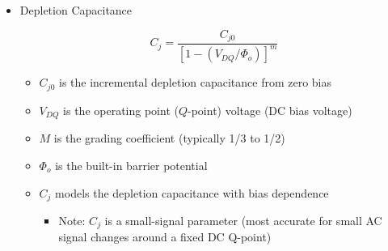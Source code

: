 \begin{itemize}
\begin{itemize}
\begin{itemize}
\begin{itemize}
            \end{itemize}

        \end{itemize}

    \end{itemize}

  \item Depletion Capacitance

    $$C_j=\frac{C_{j0}}{[1-(V_{DQ}/\Phi_o)]^m}$$

    \begin{itemize}

      \item $C_{j0}$ is the incremental depletion capacitance from zero bias

      \item $V_{DQ}$ is the operating point ($Q$-point) voltage (DC bias voltage)

      \item $M$ is the grading coefficient (typically 1/3 to 1/2)

      \item $\Phi_o$ is the built-in barrier potential

      \item $C_j$ models the depletion capacitance with bias dependence

        \begin{itemize}

          \item Note: $C_j$ is a small-signal parameter (most accurate for small AC signal changes around a fixed DC Q-point)

        \end{itemize}

    \end{itemize}

\end{itemize}



